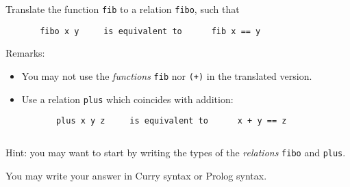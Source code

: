 \documentclass{article}
\begin{document}
Translate the function \texttt{fib} to a relation \texttt{fibo}, such that
\begin{verbatim}
       fibo x y     is equivalent to      fib x == y
\end{verbatim}

Remarks:
\begin{itemize}
\item You may not use the \emph{functions} \texttt{fib} nor \texttt{(+)} in the
  translated version.
\item Use a relation \texttt{plus} which coincides with addition:
  \begin{verbatim}
       plus x y z     is equivalent to      x + y == z
\end{verbatim}

\begin{verbatim}

\end{verbatim}
\end{itemize}

Hint: you may want to start by writing the types of the
\emph{relations} \texttt{fibo} and \texttt{plus}.

You may write your answer in Curry syntax or Prolog syntax. 
\end{document}
